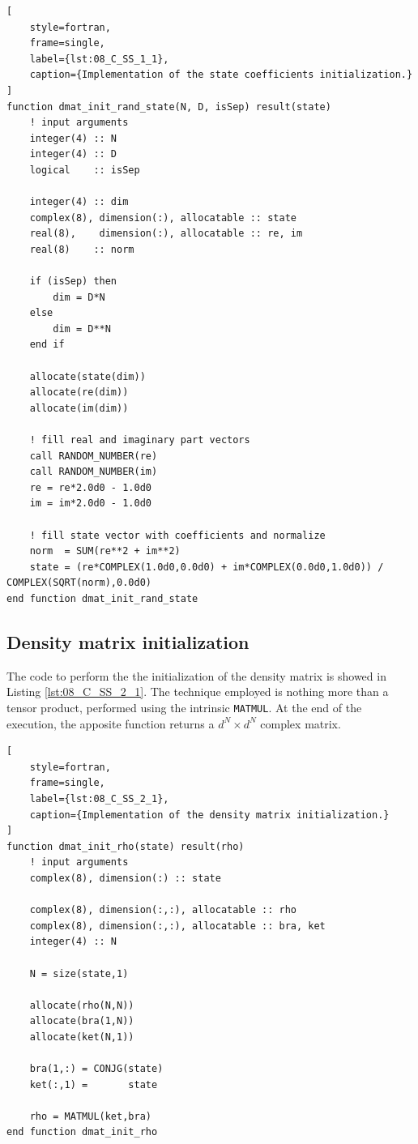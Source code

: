 \documentclass[pra, onecolumn, notitlepage, floats, 11pt]{revtex4-1}
\newcommand{\code}[2][black]{\color{#1}\texttt{#2}}
\begin{document}
\medskip
\begin{lstlisting}[
    style=fortran,
    frame=single,
    label={lst:08_C_SS_1_1},
    caption={Implementation of the state coefficients initialization.}
]
function dmat_init_rand_state(N, D, isSep) result(state)
    ! input arguments
    integer(4) :: N
    integer(4) :: D
    logical    :: isSep

    integer(4) :: dim
    complex(8), dimension(:), allocatable :: state
    real(8),    dimension(:), allocatable :: re, im
    real(8)    :: norm

    if (isSep) then
        dim = D*N
    else
        dim = D**N
    end if

    allocate(state(dim))
    allocate(re(dim))
    allocate(im(dim))

    ! fill real and imaginary part vectors
    call RANDOM_NUMBER(re)
    call RANDOM_NUMBER(im)
    re = re*2.0d0 - 1.0d0
    im = im*2.0d0 - 1.0d0

    ! fill state vector with coefficients and normalize
    norm  = SUM(re**2 + im**2)
    state = (re*COMPLEX(1.0d0,0.0d0) + im*COMPLEX(0.0d0,1.0d0)) / COMPLEX(SQRT(norm),0.0d0)
end function dmat_init_rand_state
\end{lstlisting}



\subsection{Density matrix initialization}
The code to perform the the initialization of the density matrix is showed in Listing \ref{lst:08_C_SS_2_1}. The technique employed is nothing more than a tensor product, performed using the intrinsic \code{MATMUL}. At the end of the execution, the apposite function returns a \( d^{N} \times d^{N} \) complex matrix.

\medskip
\begin{lstlisting}[
    style=fortran,
    frame=single,
    label={lst:08_C_SS_2_1},
    caption={Implementation of the density matrix initialization.}
]
function dmat_init_rho(state) result(rho)
    ! input arguments
    complex(8), dimension(:) :: state

    complex(8), dimension(:,:), allocatable :: rho
    complex(8), dimension(:,:), allocatable :: bra, ket
    integer(4) :: N

    N = size(state,1)

    allocate(rho(N,N))
    allocate(bra(1,N))
    allocate(ket(N,1))

    bra(1,:) = CONJG(state)
    ket(:,1) =       state

    rho = MATMUL(ket,bra)
end function dmat_init_rho
\end{lstlisting}
\end{document}
